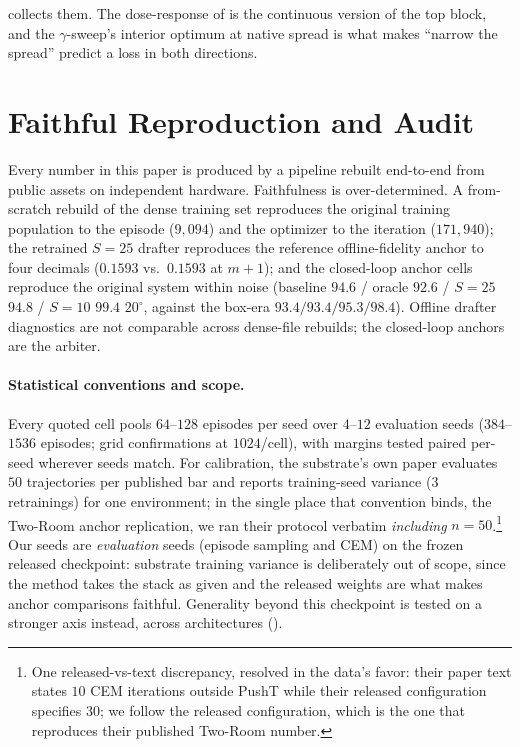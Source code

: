 \documentclass{article}
\newcommand{\degc}[1]{$#1^\circ$}
\begin{document}
 collects them. The dose-response of  is the
continuous version of the top block, and the $\gamma$-sweep's interior optimum at
native spread is what makes ``narrow the spread'' predict a loss in both directions.


\section{Faithful Reproduction and Audit}
\label{app:repro}
Every number in this paper is produced by a pipeline rebuilt end-to-end from public
assets on independent hardware. Faithfulness is over-determined. A from-scratch rebuild
of the dense training set reproduces the original training population to the episode
($9{,}094$) and the optimizer to the iteration ($171{,}940$); the retrained $S{=}25$
drafter reproduces the reference offline-fidelity anchor to four decimals ($0.1593$
vs.\ $0.1593$ at $m{+}1$); and the closed-loop anchor cells reproduce the original
system within noise (baseline $94.6$ / oracle $92.6$ / $S{=}25$ $94.8$ / $S{=}10$
$99.4$ \degc{20}, against the box-era $93.4/93.4/95.3/98.4$). Offline drafter
diagnostics are not comparable across dense-file rebuilds; the closed-loop anchors are
the arbiter.

\paragraph{Statistical conventions and scope.} Every quoted cell pools $64$--$128$
episodes per seed over $4$--$12$ evaluation seeds ($384$--$1536$ episodes; grid
confirmations at $1024$/cell), with margins tested paired per-seed wherever seeds
match. For calibration, the substrate's own paper \citep{lewm} evaluates $50$
trajectories per published bar and reports training-seed variance ($3$ retrainings)
for one environment; in the single place that convention binds, the Two-Room anchor
replication, we ran their protocol verbatim \emph{including} $n{=}50$.\footnote{One
released-vs-text discrepancy, resolved in the data's favor: their paper text states
$10$ CEM iterations outside PushT while their released configuration specifies $30$;
we follow the released configuration, which is the one that reproduces their
published Two-Room number.} Our seeds are \emph{evaluation} seeds (episode sampling
and CEM) on the frozen released checkpoint: substrate training variance is
deliberately out of scope, since the method takes the stack as given and the
released weights are what makes anchor comparisons faithful. Generality beyond this
checkpoint is tested on a stronger axis instead, across architectures
().
\end{document}

